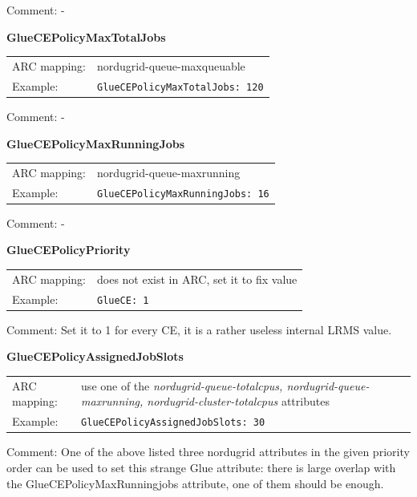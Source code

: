 \documentclass{article}
\begin{document}
Comment: -


\hspace*{0.5cm}
\begin{shaded}
 \textbf{GlueCEPolicyMaxTotalJobs} 
\end{shaded}
\begin{tabular}{lp{10cm}}  
  ARC mapping:& nordugrid-queue-maxqueuable\\
  Example:& \verb#GlueCEPolicyMaxTotalJobs: 120#\\
\end{tabular}

Comment: -


\hspace*{0.5cm}
\begin{shaded}
 \textbf{GlueCEPolicyMaxRunningJobs} 
\end{shaded}
\begin{tabular}{lp{10cm}}  
  ARC mapping:& nordugrid-queue-maxrunning\\
  Example:& \verb#GlueCEPolicyMaxRunningJobs: 16#\\
\end{tabular}

Comment: -


\hspace*{0.5cm}
\begin{shaded}
 \textbf{GlueCEPolicyPriority} 
\end{shaded}
\begin{tabular}{lp{10cm}}  
  ARC mapping:& does not exist in ARC, set it to fix value\\
  Example:& \verb#GlueCE: 1#\\
\end{tabular}

Comment: Set it to 1 for every CE, it is a rather useless internal LRMS value.


\hspace*{0.5cm}
\begin{shaded}
 \textbf{GlueCEPolicyAssignedJobSlots} 
\end{shaded}
\begin{tabular}{lp{10cm}}  
  ARC mapping:& use one of the {\it nordugrid-queue-totalcpus, 
    nordugrid-queue-maxrunning, nordugrid-cluster-totalcpus} attributes\\
  Example:& \verb#GlueCEPolicyAssignedJobSlots: 30#\\
\end{tabular}

Comment: One of the above listed three nordugrid attributes in the 
given priority order can be used to set this strange Glue attribute: 
there is large overlap with the GlueCEPolicyMaxRunningjobs attribute, 
one of them should be enough.
\end{document}
